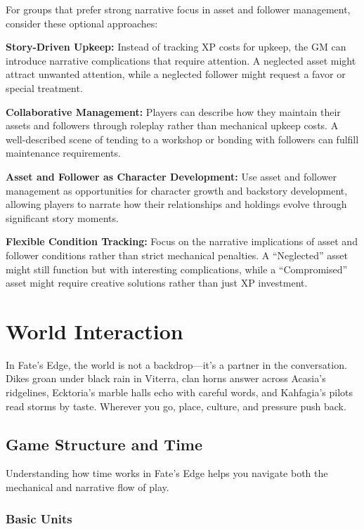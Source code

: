\documentclass[11pt,twoside,openany]{book}
\begin{document}
For groups that prefer strong narrative focus in asset and follower management, consider these optional approaches:

\textbf{Story-Driven Upkeep:} Instead of tracking XP costs for upkeep, the GM can introduce narrative complications that require attention. A neglected asset might attract unwanted attention, while a neglected follower might request a favor or special treatment.

\textbf{Collaborative Management:} Players can describe how they maintain their assets and followers through roleplay rather than mechanical upkeep costs. A well-described scene of tending to a workshop or bonding with followers can fulfill maintenance requirements.

\textbf{Asset and Follower as Character Development:} Use asset and follower management as opportunities for character growth and backstory development, allowing players to narrate how their relationships and holdings evolve through significant story moments.

\textbf{Flexible Condition Tracking:} Focus on the narrative implications of asset and follower conditions rather than strict mechanical penalties. A ``Neglected'' asset might still function but with interesting complications, while a ``Compromised'' asset might require creative solutions rather than just XP investment.

\chapter{World Interaction} \label{ch:world}

In Fate's Edge, the world is not a backdrop---it's a partner in the conversation. Dikes groan under black rain in Viterra, clan horns answer across Acasia's ridgelines, Ecktoria's marble halls echo with careful words, and Kahfagia's pilots read storms by taste. Wherever you go, place, culture, and pressure push back.

\section*{Game Structure and Time} 

Understanding how time works in Fate's Edge helps you navigate both the mechanical and narrative flow of play.

\subsection*{Basic Units}
\end{document}
